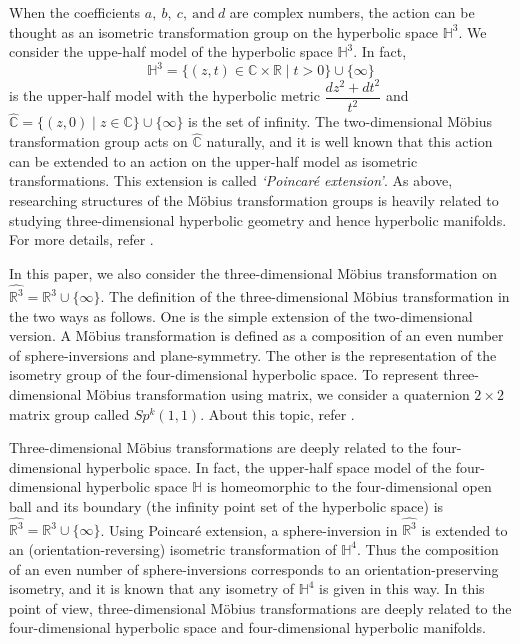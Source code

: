 When the coefficients $a,~b,~c,~\text{and}~d$ are complex numbers, 
the action can be thought as an isometric transformation group on the hyperbolic space $\mathbb{H}^3$.
We consider the uppe-half model of the hyperbolic space $\mathbb{H}^3$.
In fact, 
\[\mathbb{H}^3 = \{ (z,t) \in \mathbb{C}\times \mathbb{R}\mid t>0 \} \cup \{\infty\} \]
is the upper-half model with the hyperbolic metric $\dfrac{dz^2+dt^2}{t^2}$ and 
$\hat{\mathbb{C}} = \{ (z,0) \mid z \in \mathbb{C}\} \cup \{ \infty\}$
is the set of infinity. The two-dimensional M\"obius transformation group acts on $\hat{\mathbb{C}}$
naturally, and it is well known that this action can be extended to 
an action on the upper-half model as isometric transformations.
This extension is called \textit{\lq Poincar\'e extension\rq}.
As above, researching structures of the M\"obius transformation groups is heavily
related to studying three-dimensional hyperbolic geometry and hence hyperbolic manifolds.
For more details, refer 
\cite{Marden200705outerCircles}\cite{taniguchi_okumura199610invitation}.

In this paper, we also consider the three-dimensional M\"obius
transformation on $\hat{\mathbb{R}^3} = \mathbb{R}^3\cup\{\infty\}$.
The definition of the three-dimensional M\"obius transformation in the two ways as follows.
One is the simple extension of the two-dimensional version.
A M\"obius transformation is defined as a composition of an even number of sphere-inversions 
and plane-symmetry.
The other is the representation of the isometry group of the four-dimensional hyperbolic space.
To represent three-dimensional M\"obius transformation using matrix,
we consider a quaternion $2 \times 2$ matrix group called
$Sp^k(1,1)$. About this topic, refer
\cite{sakugawa2010limit}\cite{sakugawa2007master}.

Three-dimensional M\"obius transformations are deeply related to
the four-dimensional hyperbolic space. In fact, the upper-half space model of
the four-dimensional hyperbolic space $\mathbb{H}$ is homeomorphic to the 
four-dimensional open ball and its boundary (the infinity point set of the hyperbolic
space) is $\hat{\mathbb{R}^3} = \mathbb{R}^3\cup\{\infty\}$.
Using Poincar\'e extension, a sphere-inversion in $\hat{\mathbb{R}^3}$
is extended to an (orientation-reversing) isometric transformation of $\mathbb{H}^4$.
Thus the composition of an even number of sphere-inversions corresponds to an orientation-preserving
isometry, and it is known that any isometry of $\mathbb{H}^4$ is given in this way.
In this point of view, three-dimensional M\"obius transformations are
deeply related to the four-dimensional hyperbolic space and four-dimensional hyperbolic manifolds.

